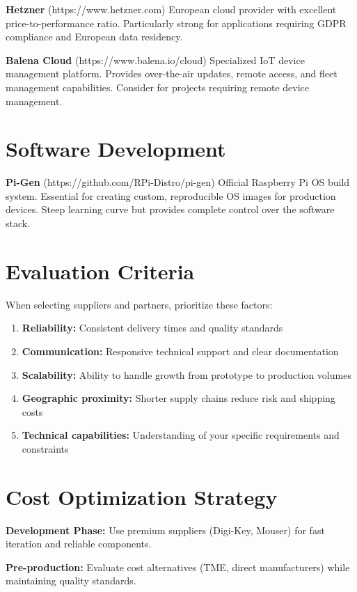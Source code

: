 \textbf{Hetzner} (https://www.hetzner.com)
European cloud provider with excellent price-to-performance ratio. Particularly strong for applications requiring GDPR compliance and European data residency.

\textbf{Balena Cloud} (https://www.balena.io/cloud)
Specialized IoT device management platform. Provides over-the-air updates, remote access, and fleet management capabilities. Consider for projects requiring remote device management.

\section{Software Development}

\textbf{Pi-Gen} (https://github.com/RPi-Distro/pi-gen)
Official Raspberry Pi OS build system. Essential for creating custom, reproducible OS images for production devices. Steep learning curve but provides complete control over the software stack.

\section{Evaluation Criteria}

When selecting suppliers and partners, prioritize these factors:

\begin{enumerate}
\item \textbf{Reliability:} Consistent delivery times and quality standards
\item \textbf{Communication:} Responsive technical support and clear documentation
\item \textbf{Scalability:} Ability to handle growth from prototype to production volumes
\item \textbf{Geographic proximity:} Shorter supply chains reduce risk and shipping costs
\item \textbf{Technical capabilities:} Understanding of your specific requirements and constraints
\end{enumerate}

\section{Cost Optimization Strategy}

\textbf{Development Phase:}
Use premium suppliers (Digi-Key, Mouser) for fast iteration and reliable components.

\textbf{Pre-production:}
Evaluate cost alternatives (TME, direct manufacturers) while maintaining quality standards.

